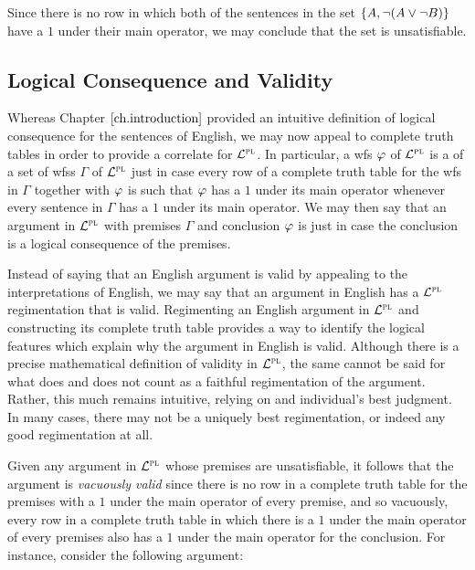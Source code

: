 Since there is no row in which both of the sentences in the set $\lbrace A, \neg (A \vee \neg B)\rbrace$ have a $1$ under their main operator, we may conclude that the set is unsatisfiable.




\subsection{Logical Consequence and Validity}
\label{sub:Consequence}


Whereas Chapter $\ref{ch.introduction}$ provided an intuitive definition of logical consequence for the sentences of English, we may now appeal to complete truth tables in order to provide a correlate for $\mathcal{L}^{\textsc{pl}}$.
In particular, a wfs $\varphi$ of $\mathcal{L}^{\textsc{pl}}$ is a  of a set of wfss $\Gamma$ of $\mathcal{L}^{\textsc{pl}}$ just in case every row of a complete truth table for the wfs in $\Gamma$ together with $\varphi$ is such that $\varphi$ has a $1$ under its main operator whenever every sentence in $\Gamma$ has a $1$ under its main operator. 
We may then say that an argument in $\mathcal{L}^{\textsc{pl}}$ with premises $\Gamma$ and conclusion $\varphi$ is  just in case the conclusion is a logical consequence of the premises. 

Instead of saying that an English argument is valid by appealing to the interpretations of English, we may say that an argument in English has a $\mathcal{L}^{\textsc{pl}}$ regimentation that is valid. 
Regimenting an English argument in $\mathcal{L}^{\textsc{pl}}$ and constructing its complete truth table provides a way to identify the logical features which explain why the argument in English is valid.
Although there is a precise mathematical definition of validity in $\mathcal{L}^{\textsc{pl}}$, the same cannot be said for what does and does not count as a faithful regimentation of the argument.
Rather, this much remains intuitive, relying on and individual's best judgment.
In many cases, there may not be a uniquely best regimentation, or indeed any good regimentation at all.

Given any argument in $\mathcal{L}^{\textsc{pl}}$ whose premises are unsatisfiable, it follows that the argument is \textit{vacuously valid} since there is no row in a complete truth table for the premises with a $1$ under the main operator of every premise, and so vacuously, every row in a complete truth table in which there is a $1$ under the main operator of every premises also has a $1$ under the main operator for the conclusion.
For instance, consider the following argument:
    
